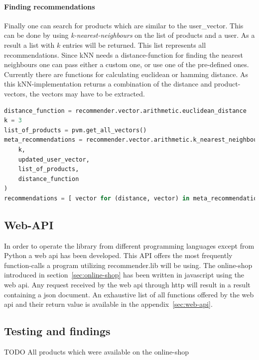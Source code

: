 \paragraph{Finding recommendations}
Finally one can search for products which are similar to the user\_vector.
This can be done by using \textit{k-nearest-neighbours} on the list of products and a user.
As a result a list with $k$ entries will be returned.
This list represents all recommendations.
Since kNN needs a distance-function for finding the nearest neighbours one can pass either a custom one, or use one of the pre-defined ones.
Currently there are functions for calculating euclidean or hamming distance.
As this kNN-implementation returns a combination of the distance and product-vectors, the vectors may have to be extracted.
\begin{lstlisting}[language=Python,caption={Retrieving recommendations},label={lst:recommenderlib-knn}]
distance_function = recommender.vector.arithmetic.euclidean_distance
k = 3
list_of_products = pvm.get_all_vectors()
meta_recommendations = recommender.vector.arithmetic.k_nearest_neighbours(
    k,
    updated_user_vector,
    list_of_products,
    distance_function
)
recommendations = [ vector for (distance, vector) in meta_recommendations ]
\end{lstlisting}

\subsection{Web-API}
In order to operate the library from different programming languages except from Python a \gls{web api} has been developed.
This API offers the most frequently function-calls a program utilizing recommender.lib will be using.
The online-shop introduced in section~\ref{sec:online-shop} has been written in \gls{javascript} using the \gls{web api}.
Any request received by the web api through \gls{http} will result in a result containing a \gls{json} document.
An exhaustive list of all functions offered by the \gls{web api} and their return value is available in the appendix~\ref{sec:web-api}.


\FloatBarrier

\subsection{Testing and findings}
\label{sec:testing-findings}
{\color{red}TODO}
All products which were available on the online-shop 



